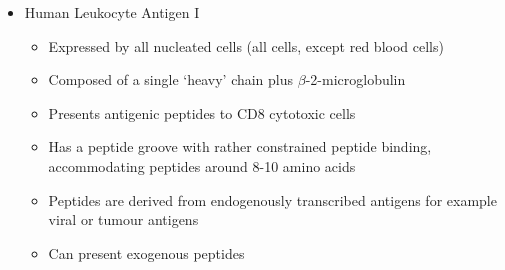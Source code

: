\documentclass[a4paper, 12pt]{article}
\begin{document}
\begin{itemize}
\begin{itemize}
\item{Human Leukocyte Antigen I}
\begin{itemize}
\item{Expressed by all nucleated cells (all cells, except red blood cells)}
\item{Composed of a single `heavy' chain plus $\beta$-2-microglobulin}
\item{Presents antigenic peptides to CD8 cytotoxic cells}
\item{Has a peptide groove with rather constrained peptide binding, accommodating peptides around 8-10 amino acids}
\item{Peptides are derived from endogenously transcribed antigens for example viral or tumour antigens}
\item{Can present exogenous peptides}
\end{itemize}
\end{itemize}
\end{itemize}
\end{document}
